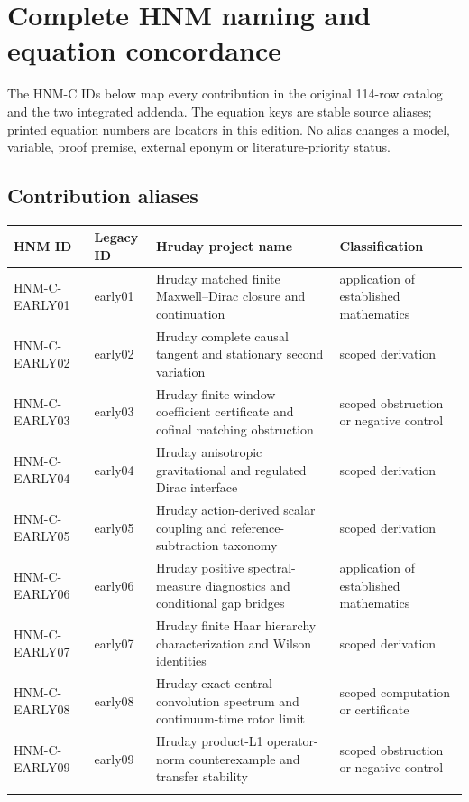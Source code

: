 \section{Complete HNM naming and equation concordance}
\label{app:hnm-names}
The HNM-C IDs below map every contribution in the original 114-row catalog and the two integrated addenda. The equation keys are stable source aliases; printed equation numbers are locators in this edition. No alias changes a model, variable, proof premise, external eponym or literature-priority status.
\subsection{Contribution aliases}
\begingroup\footnotesize\setlength{\tabcolsep}{4pt}
\begin{longtable}{@{}p{30mm}p{26mm}p{65mm}p{27mm}@{}}
\toprule HNM ID & Legacy ID & Hruday project name & Classification\\\midrule\endhead
HNM-C-EARLY01 & early01 & Hruday matched finite Maxwell--Dirac closure and continuation & application of established mathematics\\\addlinespace
HNM-C-EARLY02 & early02 & Hruday complete causal tangent and stationary second variation & scoped derivation\\\addlinespace
HNM-C-EARLY03 & early03 & Hruday finite-window coefficient certificate and cofinal matching obstruction & scoped obstruction or negative control\\\addlinespace
HNM-C-EARLY04 & early04 & Hruday anisotropic gravitational and regulated Dirac interface & scoped derivation\\\addlinespace
HNM-C-EARLY05 & early05 & Hruday action-derived scalar coupling and reference-subtraction taxonomy & scoped derivation\\\addlinespace
HNM-C-EARLY06 & early06 & Hruday positive spectral-measure diagnostics and conditional gap bridges & application of established mathematics\\\addlinespace
HNM-C-EARLY07 & early07 & Hruday finite Haar hierarchy characterization and Wilson identities & scoped derivation\\\addlinespace
HNM-C-EARLY08 & early08 & Hruday exact central-convolution spectrum and continuum-time rotor limit & scoped computation or certificate\\\addlinespace
HNM-C-EARLY09 & early09 & Hruday product-L1 operator-norm counterexample and transfer stability & scoped obstruction or negative control\\\addlinespace

\end{longtable}
